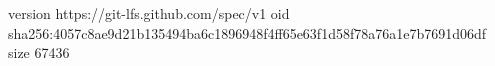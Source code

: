 version https://git-lfs.github.com/spec/v1
oid sha256:4057c8ae9d21b135494ba6c1896948f4ff65e63f1d58f78a76a1e7b7691d06df
size 67436
